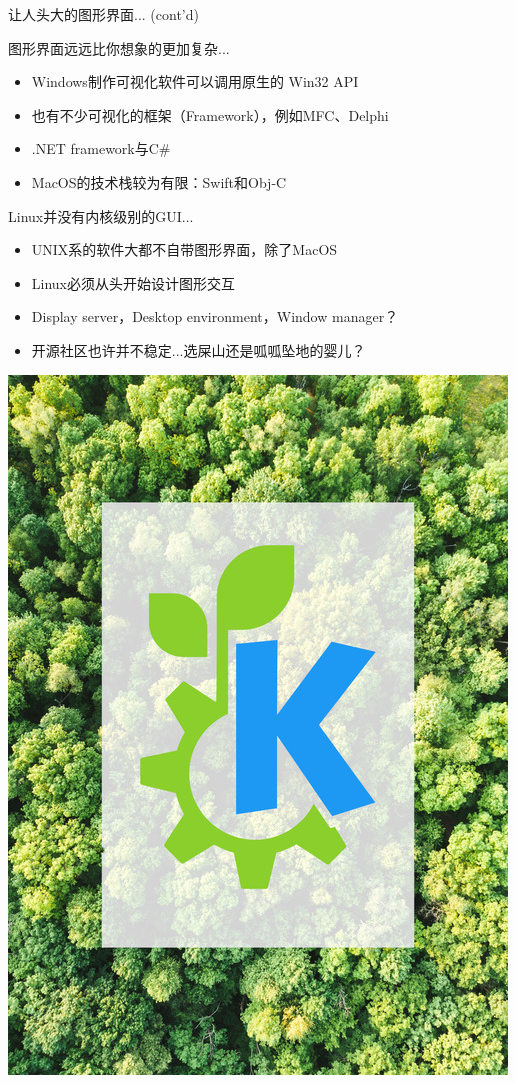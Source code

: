 \documentclass[aspectratio=1610]{beamer}
\begin{document}
\begin{frame}{让人头大的图形界面... (cont'd)}
    \begin{minipage}{0.8\linewidth}
        图形界面远远比你想象的更加复杂...
        \begin{itemize}
            \item Windows制作可视化软件可以调用原生的 \alert{Win32 API}\footnotemark
            \item 也有不少可视化的框架（Framework），例如MFC、Delphi
            \item .NET framework与C\#
            \item MacOS的技术栈较为有限：Swift和Obj-C\footnotemark
        \end{itemize}
    
        Linux并没有内核级别的GUI...
        \begin{itemize}
            \item UNIX系的软件大都不自带图形界面，除了MacOS
            \item Linux必须从头开始设计图形交互
            \item Display server，Desktop environment，Window manager？\footnotemark
            \item 开源社区也许并不稳定...选屎山还是呱呱坠地的婴儿？\footnotemark
        \end{itemize}
    \end{minipage}
    \begin{minipage}{0.18\linewidth}
        \flushright
        \includegraphics[width=\linewidth]{pic/ECO_KDE.jpg}
    \end{minipage}


\end{frame}
\end{document}
